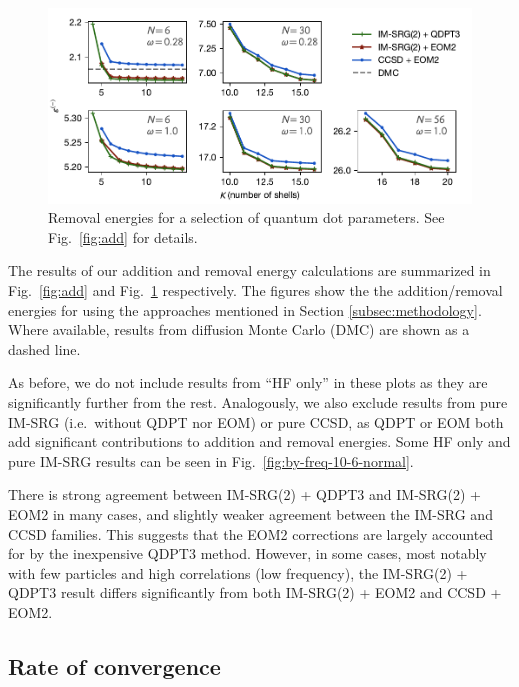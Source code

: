 \begin{figure}
  \centering
  \includegraphics{fig-rm2.pdf}
  \caption{Removal energies for a selection of quantum dot parameters.  See Fig.\ \ref{fig:add} for details.}
  \label{fig:rm}
\end{figure}

The results of our addition and removal energy calculations are summarized in Fig.\ \ref{fig:add} and Fig.\ \ref{fig:rm} respectively.  The figures show the the addition/removal energies for using the approaches mentioned in Section \ref{subsec:methodology}.  Where available, results from diffusion Monte Carlo (DMC) \cite{PhysRevB.84.115302} are shown as a dashed line.

As before, we do not include results from ``HF only'' in these plots as they are significantly further from the rest.  Analogously, we also exclude results from pure IM-SRG (i.e.\ without QDPT nor EOM) or pure CCSD, as QDPT or EOM both add significant contributions to addition and removal energies.  Some HF only and pure IM-SRG results can be seen in Fig.\ \ref{fig:by-freq-10-6-normal}.

There is strong agreement between IM-SRG(2) + QDPT3 and IM-SRG(2) + EOM2 in many cases, and slightly weaker agreement between the IM-SRG and CCSD families.  This suggests that the EOM2 corrections are largely accounted for by the inexpensive QDPT3 method.  However, in some cases, most notably with few particles and high correlations (low frequency), the IM-SRG(2) + QDPT3 result differs significantly from both IM-SRG(2) + EOM2 and CCSD + EOM2.

\subsection{Rate of convergence}

